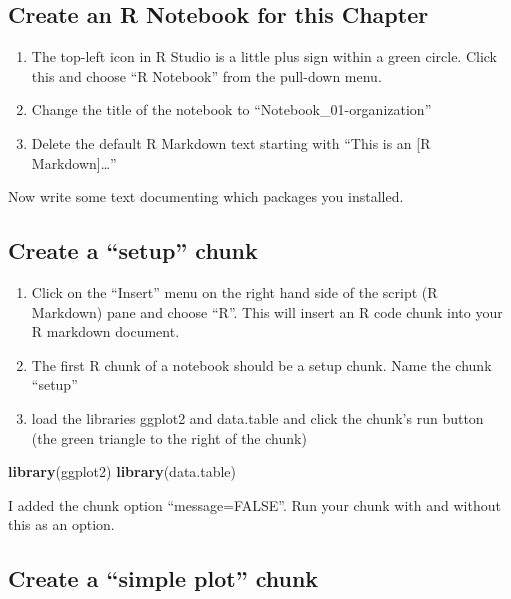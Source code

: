 \documentclass[]{book}
\newenvironment{Shaded}{\begin{snugshade}}{\end{snugshade}}
\newcommand{\KeywordTok}[1]{\textcolor[rgb]{0.13,0.29,0.53}{\textbf{#1}}}
\newcommand{\NormalTok}[1]{#1}
\providecommand{\tightlist}{%
  \setlength{\itemsep}{0pt}\setlength{\parskip}{0pt}}
\begin{document}
\subsection{Create an R Notebook for this
Chapter}\label{create-an-r-notebook-for-this-chapter}

\begin{enumerate}
\def\labelenumi{\arabic{enumi}.}
\tightlist
\item
  The top-left icon in R Studio is a little plus sign within a green
  circle. Click this and choose ``R Notebook'' from the pull-down menu.
\item
  Change the title of the notebook to ``Notebook\_01-organization''
\item
  Delete the default R Markdown text starting with ``This is an {[}R
  Markdown{]}\ldots{}''
\end{enumerate}

Now write some text documenting which packages you installed.

\subsection{\texorpdfstring{Create a ``setup''
chunk}{Create a setup chunk}}\label{create-a-setup-chunk}

\begin{enumerate}
\def\labelenumi{\arabic{enumi}.}
\tightlist
\item
  Click on the ``Insert'' menu on the right hand side of the script (R
  Markdown) pane and choose ``R''. This will insert an R code chunk into
  your R markdown document.
\item
  The first R chunk of a notebook should be a setup chunk. Name the
  chunk ``setup''
\item
  load the libraries ggplot2 and data.table and click the chunk's run
  button (the green triangle to the right of the chunk)
\end{enumerate}

\begin{Shaded}
\begin{Highlighting}[]
\KeywordTok{library}\NormalTok{(ggplot2)}
\KeywordTok{library}\NormalTok{(data.table)}
\end{Highlighting}
\end{Shaded}

I added the chunk option ``message=FALSE''. Run your chunk with and
without this as an option.

\subsection{\texorpdfstring{Create a ``simple plot''
chunk}{Create a simple plot chunk}}\label{create-a-simple-plot-chunk}
\end{document}
